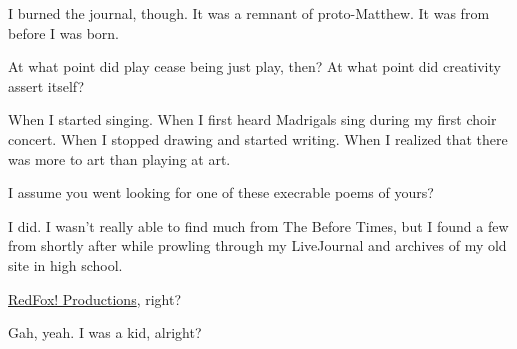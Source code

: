 I burned the journal, though. It was a remnant of proto-Matthew. It was from before I was born.

\begin{ally}
At what point did play cease being just play, then? At what point did creativity assert itself?
\end{ally}
When I started singing. When I first heard Madrigals sing during my first choir concert. When I stopped drawing and started writing. When I realized that there was more to art than playing at art.
\newpage

\begin{ally}
I assume you went looking for one of these execrable poems of yours?
\end{ally}
I did. I wasn't really able to find much from The Before Times, but I found a few from shortly after while prowling through my LiveJournal and archives of my old site in high school.

\begin{ally}
\href{https://web.archive.org/web/2005*/http://ranna.babylonia.flatirons.org/}{RedFox! Productions}, right?
\end{ally}
Gah, yeah. I was a kid, alright?

